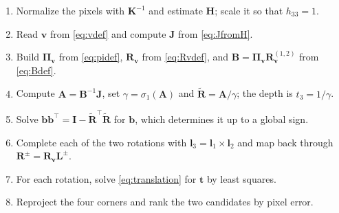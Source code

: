 \documentclass[11pt,a4paper]{article}
\theoremstyle{remark}
\newcommand{\Rmat}{\mathbf{R}}
\newcommand{\Rtil}{\widetilde{\mathbf{R}}}
\newcommand{\Amat}{\mathbf{A}}
\newcommand{\Bmat}{\mathbf{B}}
\newcommand{\Hmat}{\mathbf{H}}
\newcommand{\Jmat}{\mathbf{J}}
\newcommand{\Kmat}{\mathbf{K}}
\newcommand{\Lmat}{\mathbf{L}}
\newcommand{\Rvee}{\mathbf{R}_{\vvec}}
\newcommand{\Pimat}{\boldsymbol{\Pi}_{\vvec}}
\newcommand{\Idm}{\mathbf{I}}
\newcommand{\bvec}{\mathbf{b}}
\newcommand{\lvec}{\mathbf{l}}
\newcommand{\tvec}{\mathbf{t}}
\newcommand{\vvec}{\mathbf{v}}
\begin{document}
\begin{enumerate}[leftmargin=*]
  \item Normalize the pixels with $\Kmat^{-1}$ and estimate $\Hmat$; scale it so
        that $h_{33} = 1$.
  \item Read $\vvec$ from \eqref{eq:vdef} and compute $\Jmat$ from
        \eqref{eq:JfromH}.
  \item Build $\Pimat$ from \eqref{eq:pidef}, $\Rvee$ from \eqref{eq:Rvdef}, and
        $\Bmat = \Pimat\Rvee^{(1,2)}$ from \eqref{eq:Bdef}.
  \item Compute $\Amat = \Bmat^{-1}\Jmat$, set $\gamma = \sigma_1(\Amat)$ and
        $\Rtil = \Amat/\gamma$; the depth is $t_3 = 1/\gamma$.
  \item Solve $\bvec\bvec^{\top} = \Idm - \Rtil^{\top}\Rtil$ for $\bvec$, which
        determines it up to a global sign.
  \item Complete each of the two rotations with
        $\lvec_3 = \lvec_1 \times \lvec_2$ and map back through
        $\Rmat^{\pm} = \Rvee\Lmat^{\pm}$.
  \item For each rotation, solve \eqref{eq:translation} for $\tvec$ by least
        squares.
  \item Reproject the four corners and rank the two candidates by pixel error.
\end{enumerate}
\end{document}
